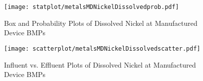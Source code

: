         \begin{figure}[hb]   %
            \centering
            \texttt{[image: statplot/metalsMDNickelDissolvedprob.pdf]}
            \caption{Box and Probability Plots of Dissolved Nickel at Manufactured Device BMPs}
        \end{figure}         %
        
        
        \begin{figure}[hb]   %
            \centering
            \texttt{[image: scatterplot/metalsMDNickelDissolvedscatter.pdf]}
            \caption{Influent vs. Effluent Plots of Dissolved Nickel at Manufactured Device BMPs}
        \end{figure}         %
        \clearpage
        